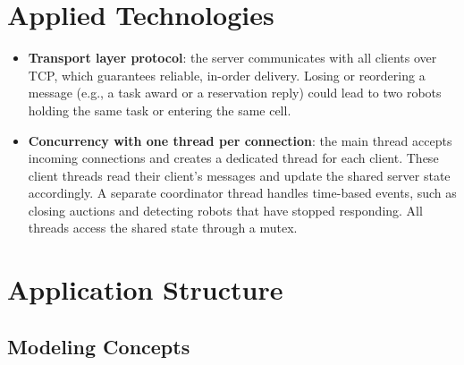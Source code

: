 \documentclass[runningheads]{llncs}
\begin{document}
\section{Applied Technologies}

\begin{itemize}
  \item \textbf{Transport layer protocol}: the server communicates with all clients over TCP, which guarantees reliable, in-order delivery. Losing or reordering a message (e.g., a task award or a reservation reply) could lead to two robots holding the same task or entering the same cell.

  \item \textbf{Concurrency with one thread per connection}: the main thread accepts incoming connections and creates a dedicated thread for each client. These client threads read their client's messages and update the shared server state accordingly. A separate coordinator thread handles time-based events, such as closing auctions and detecting robots that have stopped responding. All threads access the shared state through a mutex.
\end{itemize}

\section{Application Structure}

\subsection{Modeling Concepts}
\end{document}
